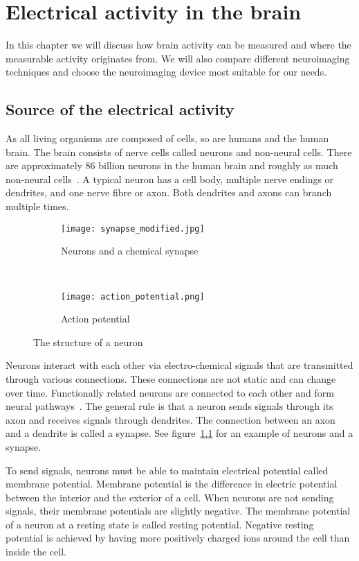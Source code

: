 
\chapter{Electrical activity in the brain}

In this chapter we will discuss how brain activity can be measured and where the measurable activity originates from. We will also compare different neuroimaging techniques and choose the neuroimaging device most suitable for our needs. 

\section{Source of the electrical activity}
\label{sec:neuron}

As all living organisms are composed of cells, so are humans and the human brain. The brain consists of nerve cells called neurons and non-neural cells. There are approximately 86 billion neurons in the human brain and roughly as much non-neural cells~\cite{neuroncount}. A typical neuron has a cell body, multiple nerve endings or dendrites, and one nerve fibre or axon. Both dendrites and axons can branch multiple times. 

\begin{figure}[b!]
	\centering
	\begin{subfigure}{0.48\textwidth}
		\texttt{[image: synapse\_modified.jpg]}
		\caption{Neurons and a chemical synapse~\cite[p.~17]{neuronpic}}
		\label{fig:neuron_synapse}
	\end{subfigure}
	~
	\begin{subfigure}{0.48\textwidth}
		\texttt{[image: action\_potential.png]}
		\caption{Action potential~\cite{action_potential_pic}}
		\label{fig:action_potential}
	\end{subfigure}
	\caption{The structure of a neuron}
\end{figure}

Neurons interact with each other via electro-chemical signals that are transmitted through various connections. These connections are not static and can change over time. Functionally related neurons are connected to each other and form neural pathways~\cite{neuralpathway}. The general rule is that a neuron sends signals through its axon and receives signals through dendrites. The connection between an axon and a dendrite is called a synapse. See figure~\ref{fig:neuron_synapse} for an example of neurons and a synapse.

To send signals, neurons must be able to maintain electrical potential called membrane potential. Membrane potential is the difference in electric potential between the interior and the exterior of a cell. When neurons are not sending signals, their membrane potentials are slightly negative. The membrane potential of a neuron at a resting state is called resting potential. Negative resting potential is achieved by having more positively charged ions around the cell than inside the cell.

